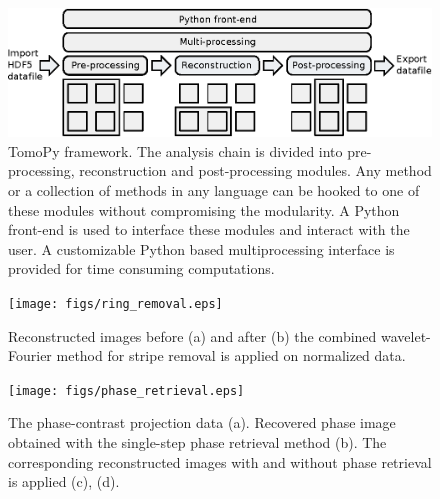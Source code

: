 \documentclass[pdf]{iucr}              %
\begin{document}




\begin{figure}
\centering
\includegraphics[width=\textwidth]{figs/framework.eps}
\caption{TomoPy framework. The analysis chain is divided into pre-processing, reconstruction and post-processing modules. Any method or a collection of methods in any language can be hooked to one of these modules without compromising the modularity. A Python front-end is used to interface these modules and interact with the user. A customizable Python based multiprocessing interface is provided for time consuming computations.}
\label{fig:Framework}
\end{figure}

\begin{figure}
\centering
\texttt{[image: figs/ring\_removal.eps]}
\caption{Reconstructed images before (a) and after (b) the combined wavelet-Fourier method for stripe removal is applied on normalized data.}
\label{fig:ProcessRing}
\end{figure}

\begin{figure}
\centering
\texttt{[image: figs/phase\_retrieval.eps]}
\caption{The phase-contrast projection data (a). Recovered phase image obtained with the single-step phase retrieval method (b). The corresponding reconstructed images with and without phase retrieval is applied (c), (d).}
\label{fig:ProcessPhase}
\end{figure}
\end{document}
